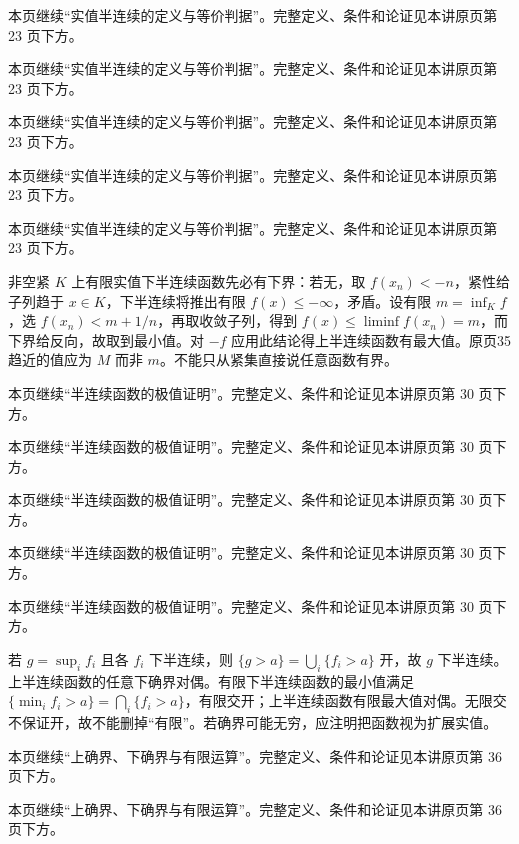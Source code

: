 本页继续“实值半连续的定义与等价判据”。完整定义、条件和论证见本讲原页第 23 页下方。

本页继续“实值半连续的定义与等价判据”。完整定义、条件和论证见本讲原页第 23 页下方。

本页继续“实值半连续的定义与等价判据”。完整定义、条件和论证见本讲原页第 23 页下方。

本页继续“实值半连续的定义与等价判据”。完整定义、条件和论证见本讲原页第 23 页下方。

本页继续“实值半连续的定义与等价判据”。完整定义、条件和论证见本讲原页第 23 页下方。

非空紧 $K$ 上有限实值下半连续函数先必有下界：若无，取 $f(x_n)<-n$，紧性给子列趋于 $x\in K$，下半连续将推出有限 $f(x)\le-\infty$，矛盾。设有限 $m=\inf_K f$，选 $f(x_n)<m+1/n$，再取收敛子列，得到 $f(x)\le\liminf f(x_n)=m$，而下界给反向，故取到最小值。对 $-f$ 应用此结论得上半连续函数有最大值。原页35趋近的值应为 $M$ 而非 $m$。不能只从紧集直接说任意函数有界。

本页继续“半连续函数的极值证明”。完整定义、条件和论证见本讲原页第 30 页下方。

本页继续“半连续函数的极值证明”。完整定义、条件和论证见本讲原页第 30 页下方。

本页继续“半连续函数的极值证明”。完整定义、条件和论证见本讲原页第 30 页下方。

本页继续“半连续函数的极值证明”。完整定义、条件和论证见本讲原页第 30 页下方。

本页继续“半连续函数的极值证明”。完整定义、条件和论证见本讲原页第 30 页下方。

若 $g=\sup_i f_i$ 且各 $f_i$ 下半连续，则 $\{g>a\}=\bigcup_i\{f_i>a\}$ 开，故 $g$ 下半连续。上半连续函数的任意下确界对偶。有限下半连续函数的最小值满足 $\{\min_i f_i>a\}=\bigcap_i\{f_i>a\}$，有限交开；上半连续函数有限最大值对偶。无限交不保证开，故不能删掉“有限”。若确界可能无穷，应注明把函数视为扩展实值。

本页继续“上确界、下确界与有限运算”。完整定义、条件和论证见本讲原页第 36 页下方。

本页继续“上确界、下确界与有限运算”。完整定义、条件和论证见本讲原页第 36 页下方。

